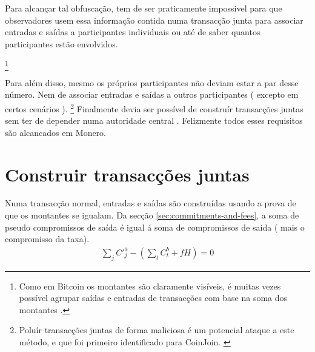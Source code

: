 Para alcançar tal obfuscação, tem de ser praticamente impossivel para que observadores usem essa informação contida numa transacção junta para associar entradas e saídas a participantes individuais ou até de saber quantos participantes estão envolvidos. 

\footnote{Como em Bitcoin os montantes são claramente visíveis, é muitas vezes possível agrupar saídas e entradas de transacções com base na soma dos montantes \cite{coinjoin-sudoku}.}

Para além disso, mesmo os próprios participantes não deviam estar a par desse número. Nem de associar entradas e saídas a outros participantes ( excepto em certos cenários ).
\footnote{Poluír transacções juntas de forma maliciosa é um potencial ataque a este método, e que foi primeiro identificado para CoinJoin. \cite{coinjoin-pollution}} 
Finalmente devia ser possível de construír transacções juntas sem ter de depender numa autoridade central \cite{exa-blockchain-analysis}. Felizmente todos esses requisitos são alcancados em Monero.

\section{Construir transacções juntas}
\label{sec:building-txtangle}

Numa transacção normal, entradas e saídas são construídas usando a prova de que os montantes se igualam. Da secção \ref{sec:commitments-and-fees}, a soma de pseudo compromissos de saída é igual á soma de compromissos de saída ( mais o compromisso da taxa).
\begin{align*}
\sum_j C'^a_{j} - (\sum_t C^b_{t} + f H) = 0
\end{align*}

